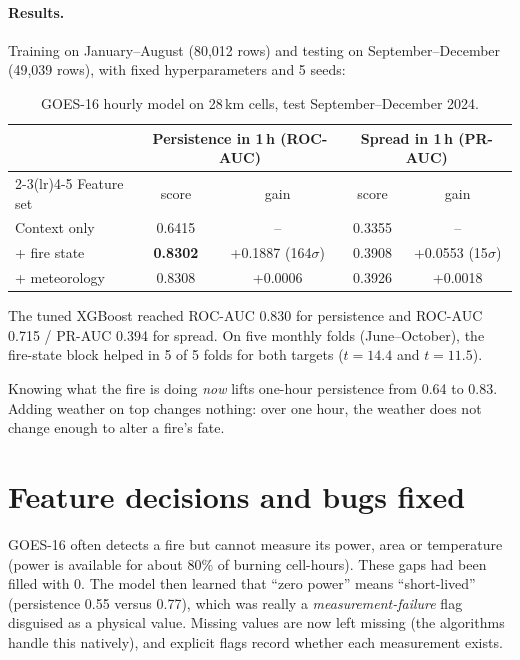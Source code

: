 \documentclass[11pt,a4paper,oneside]{report}
\newcommand{\sig}{\ensuremath{\sigma}}
\begin{document}
\paragraph{Results.} Training on January--August (80{,}012 rows) and testing on
September--December (49{,}039 rows), with fixed hyperparameters and 5 seeds:

\begin{table}[H]
\centering\small
\caption[GOES-16 28\,km model, holdout]{GOES-16 hourly model on 28\,km cells, test
September--December 2024.}
\label{tab:goes-holdout}
\begin{tabular}{lcccc}
\toprule
 & \multicolumn{2}{c}{Persistence in 1\,h (ROC-AUC)} & \multicolumn{2}{c}{Spread in 1\,h (PR-AUC)} \\
\cmidrule(lr){2-3}\cmidrule(lr){4-5}
Feature set & score & gain & score & gain \\
\midrule
Context only & 0.6415 & -- & 0.3355 & -- \\
+ fire state & \textbf{0.8302} & +0.1887 (164\sig) & 0.3908 & +0.0553 (15\sig) \\
+ meteorology & 0.8308 & +0.0006 & 0.3926 & +0.0018 \\
\bottomrule
\end{tabular}
\end{table}

The tuned XGBoost reached ROC-AUC 0.830 for persistence and ROC-AUC 0.715 /
PR-AUC 0.394 for spread. On five monthly folds (June--October), the fire-state
block helped in 5 of 5 folds for both targets ($t=14.4$ and $t=11.5$).

\begin{keybox}
Knowing what the fire is doing \emph{now} lifts one-hour persistence from 0.64 to
0.83. Adding weather on top changes nothing: over one hour, the weather does not
change enough to alter a fire's fate.
\end{keybox}

\section{Feature decisions and bugs fixed}

\begin{warnbox}
GOES-16 often detects a fire but cannot measure its power, area or temperature
(power is available for about 80\% of burning cell-hours). These gaps had been filled
with 0. The model then learned that \enquote{zero power} means \enquote{short-lived}
(persistence 0.55 versus 0.77), which was really a \emph{measurement-failure}
flag disguised as a physical value. Missing values are now left missing (the
algorithms handle this natively), and explicit flags record whether each
measurement exists.
\end{warnbox}
\end{document}
